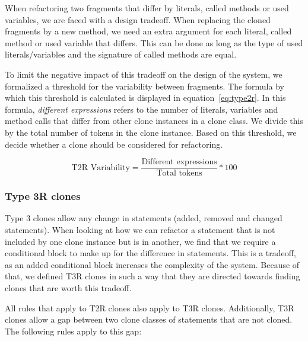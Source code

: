 \documentclass[a4paper]{article}
\begin{document}
When refactoring two fragments that differ by literals, called methods or used variables, we are faced with a design tradeoff. When replacing the cloned fragments by a new method, we need an extra argument for each literal, called method or used variable that differs. This can be done as long as the type of used literals/variables and the signature of called methods are equal.

To limit the negative impact of this tradeoff on the design of the system, we formalized a threshold for the variability between fragments. The formula by which this threshold is calculated is displayed in equation~\ref{eq:type2r}. In this formula, \textit{different expressions} refers to the number of literals, variables and method calls that differ from other clone instances in a clone class. We divide this by the total number of tokens in the clone instance. Based on this threshold, we decide whether a clone should be considered for refactoring.

\begin{equation}\label{eq:type2r}
\text{T2R Variability}=\frac{\text{Different expressions}}{\text{Total tokens}}*100
\end{equation}

\subsubsection{Type 3R clones}\label{sec:type3r}
Type 3 clones allow any change in statements (added, removed and changed statements). When looking at how we can refactor a statement that is not included by one clone instance but is in another, we find that we require a conditional block to make up for the difference in statements. This is a tradeoff, as an added conditional block increases the complexity of the system. Because of that, we defined T3R clones in such a way that they are directed towards finding clones that are worth this tradeoff.

All rules that apply to T2R clones also apply to T3R clones. Additionally, T3R clones allow a gap between two clone classes of statements that are not cloned. The following rules apply to this gap:
\end{document}
